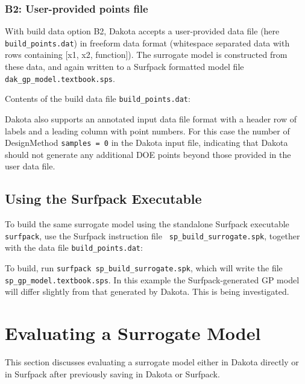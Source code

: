 \documentclass{article}
\begin{document}
\subsubsection*{B2: User-provided points file}

With build data option B2, Dakota accepts a user-provided data file
(here {\tt build\_points.dat}) in freeform data format (whitespace
separated data with rows containing [x1, x2, function]).  The
surrogate model is constructed from these data, and again written to a
Surfpack formatted model file {\tt dak\_gp\_model.textbook.sps}.

Contents of the build data file {\tt build\_points.dat}:\\
\begin{bigbox}

\end{bigbox}

Dakota also supports an annotated input data file format with a header
row of labels and a leading column with point numbers.  For this case
the number of DesignMethod {\tt samples = 0} in the Dakota input file,
indicating that Dakota should not generate any additional DOE points
beyond those provided in the user data file.

\subsection{Using the Surfpack Executable}

To build the same surrogate model using the standalone Surfpack
executable {\tt surfpack}, use the Surfpack instruction file {\tt
  sp\_build\_surrogate.spk}, together with the data file 
{\tt build\_points.dat}:\\
\begin{bigbox}

\end{bigbox}

To build, run {\tt surfpack sp\_build\_surrogate.spk}, which will
write the file {\tt sp\_gp\_model.textbook.sps}.  In this example the
Surfpack-generated GP model will differ slightly from that generated
by Dakota.  This is being investigated.

\section{Evaluating a Surrogate Model}

This section discusses evaluating a surrogate model either in Dakota
directly or in Surfpack after previously saving in Dakota or Surfpack.
\end{document}
